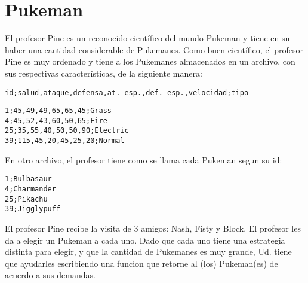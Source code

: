 \section{Pukeman}

El profesor Pine es un reconocido científico del mundo Pukeman y tiene en su haber una cantidad considerable de Pukemanes. Como buen científico, el profesor Pine es muy ordenado y tiene a los Pukemanes almacenados en un archivo, con sus respectivas características, de la siguiente manera:

\texttt{id;salud,ataque,defensa,at. esp.,def. esp.,velocidad;tipo}

\begin{lstlisting}[style=consola]
1;45,49,49,65,65,45;Grass
4;45,52,43,60,50,65;Fire
25;35,55,40,50,50,90;Electric
39;115,45,20,45,25,20;Normal
\end{lstlisting}

En otro archivo, el profesor tiene como se llama cada Pukeman segun su id:

\begin{lstlisting}[style=consola]
1;Bulbasaur
4;Charmander
25;Pikachu
39;Jigglypuff
\end{lstlisting}

El profesor Pine recibe la visita de 3 amigos: Nash, Fisty y Block. El profesor les da a elegir un Pukeman a cada uno. Dado que cada uno tiene una estrategia distinta para elegir, y que la cantidad de Pukemanes es muy grande, Ud. tiene que ayudarles escribiendo una funcion que retorne al (los) Pukeman(es) de acuerdo a sus demandas.

